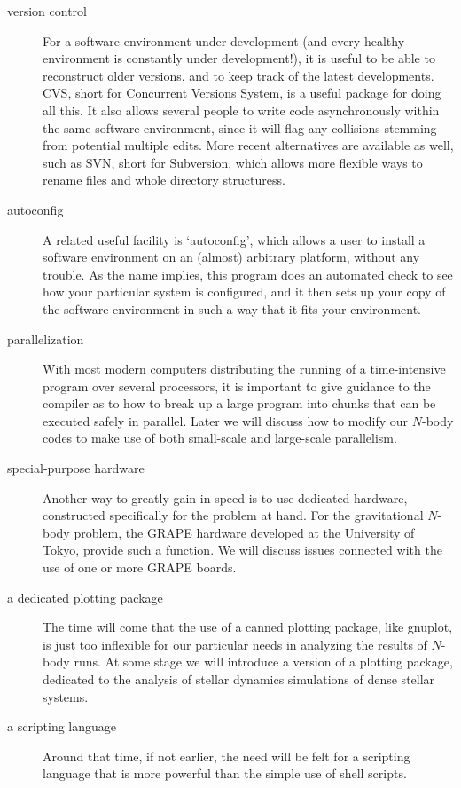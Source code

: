 \begin{description}
\item[version control]
For a software environment under development (and every healthy
environment is constantly under development!), it is useful to be able
to reconstruct older versions, and to keep track of the latest
developments.  CVS, short for Concurrent Versions System, is a useful
package for doing all this.  It also allows several people to write
code asynchronously within the same software environment, since it
will flag any collisions stemming from potential multiple edits.  More
recent alternatives are available as well, such as SVN, short for
Subversion, which allows more flexible ways to rename files and whole
directory structuress.

\item[autoconfig]
A related useful facility is `autoconfig', which allows a user to
install a software environment on an (almost) arbitrary platform,
without any trouble.  As the name implies, this program does an
automated check to see how your particular system is configured, and
it then sets up your copy of the software environment in such a way
that it fits your environment.

\item[parallelization]
With most modern computers distributing the running of a
time-intensive program over several processors, it is important to
give guidance to the compiler as to how to break up a large program
into chunks that can be executed safely in parallel.  Later we will
discuss how to modify our $N$-body codes to make use of both
small-scale and large-scale parallelism.

\item[special-purpose hardware]
Another way to greatly gain in speed is to use dedicated hardware,
constructed specifically for the problem at hand.  For the
gravitational $N$-body problem, the GRAPE hardware developed at the
University of Tokyo, provide such a function.  We will discuss issues
connected with the use of one or more GRAPE boards.

\item[a dedicated plotting package]
The time will come that the use of a canned plotting package, like
gnuplot, is just too inflexible for our particular needs in analyzing
the results of $N$-body runs.  At some stage we will introduce a
version of a plotting package, dedicated to the analysis of
stellar dynamics simulations of dense stellar systems.

\item[a scripting language]
Around that time, if not earlier, the need will be felt for a
scripting language that is more powerful than the simple use of shell
scripts.


\end{description}
